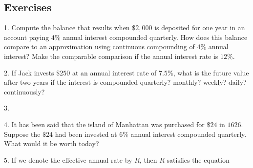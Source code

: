 \documentclass[10pt,]{book}
\theoremstyle{plain}
\theoremstyle{definition}
\theoremstyle{definition}
\theoremstyle{definition}
\numberwithin{equation}{section}
\begin{document}
\subsection[{Exercises}]{Exercises}\label{exercises-8}
\begin{exerciselist}
\item[1.]\hypertarget{exercise-50}{}\hypertarget{p-222}{}%
Compute the balance that results when \(\$2,000\) is deposited for one year in an account paying \(4\%\) annual interest compounded quarterly.  How does this balance compare to an approximation using continuous compounding of \(4\%\) annual interest? Make the comparable comparison if the annual interest rate is \(12\%\).%
\par\smallskip
\item[2.]\hypertarget{exercise-51}{}\hypertarget{p-223}{}%
If Jack invests \(\$250\) at an annual interest rate of \(7.5\%\), what is the future value after two years if the interest is compounded quarterly? monthly? weekly? daily? continuously?%
\par\smallskip
\item[3.]\hypertarget{exercise-52}{}\leavevmode%
\par\smallskip
\item[4.]\hypertarget{exercise-53}{}\hypertarget{p-224}{}%
It has been said that the island of Manhattan was purchased for \(\$24\) in \(1626\).  Suppose the \(\$24\) had been invested at \(6\%\) annual interest compounded quarterly.  What would it be worth today?%
\par\smallskip
\item[5.]\hypertarget{exercise-54}{}\hypertarget{p-225}{}%
If we denote the effective annual rate by \(R\), then \(R\) satisfies the equation%

\end{exerciselist}
\end{document}
